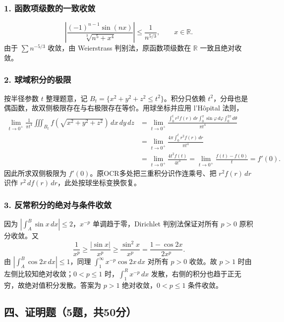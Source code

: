 \documentclass[11pt,fontset=fandol]{ctexart}
\begin{document}
\subsubsection{1.
函数项级数的一致收敛}\label{ux51fdux6570ux9879ux7ea7ux6570ux7684ux4e00ux81f4ux6536ux655b}

\[
\left|\frac{(-1)^{n-1}\sin(nx)}{\sqrt[3]{n^5+x^4}}\right|
\le\frac1{n^{5/3}},\qquad x\in\mathbb R.
\] 由于 \(\sum n^{-5/3}\) 收敛，由 Weierstrass 判别法，原函数项级数在
\(\mathbb R\) 一致且绝对收敛。

\subsubsection{2.
球域积分的极限}\label{ux7403ux57dfux79efux5206ux7684ux6781ux9650}

按半径参数 \(t\) 整理题意，记 \(B_t=\{x^2+y^2+z^2\le t^2\}\)。积分只依赖
\(t^2\)，分母也是偶函数，故双侧极限存在与右极限存在等价。用球坐标并应用
l'Hôpital 法则， \[
\begin{aligned}
\lim_{t\to0^+}\frac1{\pi t^4}\iiint_{B_t}f(\sqrt{x^2+y^2+z^2})\,dx\,dy\,dz
&=\lim_{t\to0^+}\frac{\int_0^tr^2f(r)\,dr\int_0^\pi\sin\varphi\,d\varphi\int_0^{2\pi}d\theta}{\pi t^4}\\
&=\lim_{t\to0^+}\frac{4\pi\int_0^tr^2f(r)\,dr}{\pi t^4}\\
&=\lim_{t\to0^+}\frac{4t^2f(t)}{4t^3}
=\lim_{t\to0^+}\frac{f(t)-f(0)}t=f'(0).
\end{aligned}
\] 因此所求双侧极限为 \(f'(0)\)。原OCR多处把三重积分识作连乘号、把
\(r^2f(r)\,dr\) 识作 \(r^2\,df(r)\,dr\)，此处按球坐标变换恢复。

\subsubsection{3.
反常积分的绝对与条件收敛}\label{ux53cdux5e38ux79efux5206ux7684ux7eddux5bf9ux4e0eux6761ux4ef6ux6536ux655b}

因为 \(|\int_A^B\sin x\,dx|\le2\)，\(x^{-p}\) 单调趋于零，Dirichlet
判别法保证对所有 \(p>0\) 原积分收敛。又 \[
\frac1{x^p}\ge\frac{|\sin x|}{x^p}\ge\frac{\sin^2x}{x^p}
=\frac{1-\cos2x}{2x^p}.
\] 由 \(|\int_A^B\cos2x\,dx|\le1\)，同理
\(\int_1^\infty x^{-p}\cos2x\,dx\) 对所有 \(p>0\) 收敛。故 \(p>1\)
时由左侧比较知绝对收敛；\(0<p\le1\) 时，\(\int_1^R x^{-p}\,dx\)
发散，右侧的积分也趋于正无穷，故绝对值积分发散。答案为 \(p>1\)
绝对收敛，\(0<p\le1\) 条件收敛。

\subsection{四、证明题（5题，共50分）}\label{ux56dbux8bc1ux660eux98985ux9898ux517150ux5206}
\end{document}
